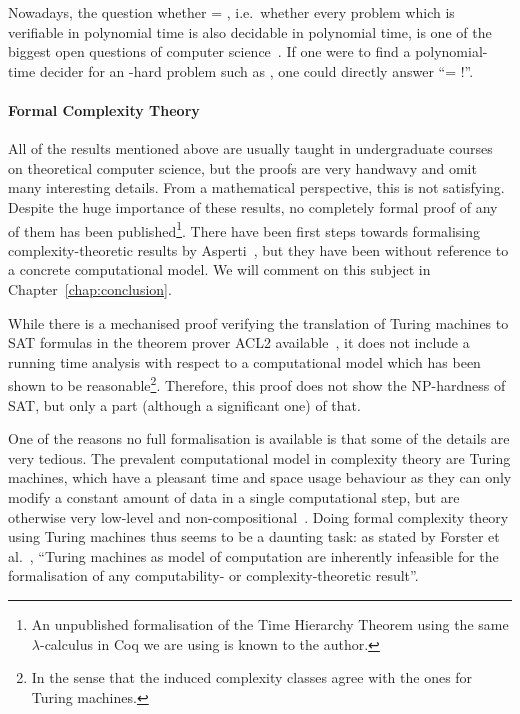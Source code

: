 Nowadays, the question whether \PC{} = \NP{}, i.e.\ whether every problem which is verifiable in polynomial time is also decidable in polynomial time, is one of the biggest open questions of computer science~\cite{claymath}. 
If one were to find a polynomial-time decider for an \NP{}-hard problem such as \SAT{}, one could directly answer ``\PC{}= \NP{}!''.

\paragraph{Formal Complexity Theory}
All of the results mentioned above are usually taught in undergraduate courses on theoretical computer science, but the proofs are very handwavy and omit many interesting details. From a mathematical perspective, this is not satisfying.
Despite the huge importance of these results, no completely formal proof of any of them has been published\footnote{An unpublished formalisation of the Time Hierarchy Theorem using the same $\lambda$-calculus in Coq we are using is known to the author.}. 
There have been first steps towards formalising complexity-theoretic results by Asperti~\cite{asperti:reverse_complexity, asperti:borodin}, but they have been without reference to a concrete computational model. We will comment on this subject in Chapter~\ref{chap:conclusion}.

While there is a mechanised proof verifying the translation of Turing machines to SAT formulas in the theorem prover ACL2 available~\cite{gamboa:cook}, it does not include a running time analysis with respect to a computational model which has been shown to be reasonable\footnote{In the sense that the induced complexity classes agree with the ones for Turing machines.}. Therefore, this proof does not show the NP-hardness of SAT, but only a part (although a significant one) of that.

One of the reasons no full formalisation is available is that some of the details are very tedious. The prevalent computational model in complexity theory are Turing machines, which have a pleasant time and space usage behaviour as they can only modify a constant amount of data in a single computational step, but are otherwise very low-level and non-compositional~\cite{ForsterEtAl:2019:VerifiedTMs}.
Doing formal complexity theory using Turing machines thus seems to be a daunting task: as stated by Forster et al.~\cite{ForsterEtAl:2019:VerifiedTMs}, ``Turing machines as model of computation are inherently infeasible for the formalisation of any computability- or complexity-theoretic result''. 

